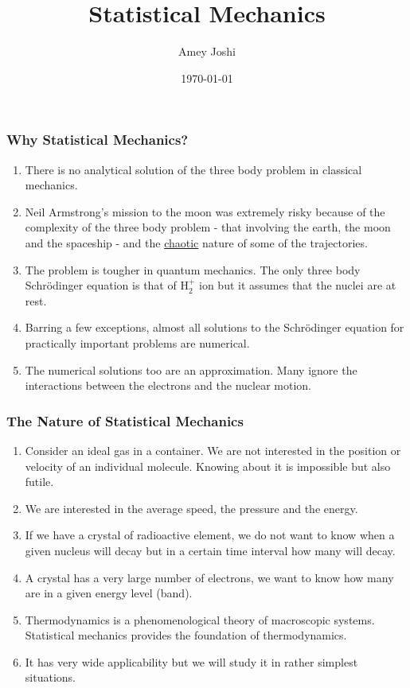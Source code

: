\documentclass{beamer}
\title{Statistical Mechanics}
\author{Amey Joshi}
\date{\today}
\begin{document}
\begin{frame}
\titlepage
\end{frame}

\begin{frame}
\frametitle{Why Statistical Mechanics?}
\begin{enumerate}
\item There is no analytical solution of the three body problem in classical
mechanics. 
\item Neil Armstrong's mission to the moon was extremely risky because of the
complexity of the three body problem - that involving the earth, the moon and
the spaceship - and the \href{https://galileo-unbound.blog/tag/three-body-problem/}{chaotic}
nature of some of the trajectories.
\item The problem is tougher in quantum mechanics. The only three body 
Schr\"{o}dinger equation is that of H$_2^+$ ion but it assumes that the nuclei
are at rest.
\item Barring a few exceptions, almost all solutions to the Schr\"{o}dinger 
equation for practically important problems are numerical.
\item The numerical solutions too are an approximation. Many ignore the 
interactions between the electrons and the nuclear motion.
\end{enumerate}
\end{frame}

\begin{frame}
\frametitle{The Nature of Statistical Mechanics}
\begin{enumerate}
\item Consider an ideal gas in a container. We are not interested in the 
position or velocity of an individual molecule. Knowing about it is impossible
but also futile.
\item We are interested in the average speed, the pressure and the energy.
\item If we have a crystal of radioactive element, we do not want to know when a
given nucleus will decay but in a certain time interval how many will decay.
\item A crystal has a very large number of electrons, we want to know how many
are in a given energy level (band).
\item Thermodynamics is a phenomenological theory of macroscopic systems.
Statistical mechanics provides the foundation of thermodynamics.
\item It has very wide applicability but we will study it in rather simplest
situations.
\end{enumerate}
\end{frame}
\end{document}
